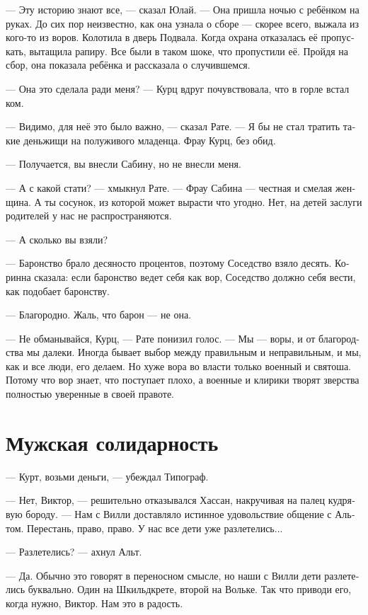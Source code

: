 \documentclass[a4paper,12pt,fleqn]{book}\usepackage{polyglossia}\setdefaultlanguage[babelshorthands=true]{russian}\setotherlanguage{english}\defaultfontfeatures{Ligatures=TeX,Mapping=tex-text}\usepackage{xcolor}\newcommand{\ml}[3]{#2}
\begin{document}
--- Эту историю знают все, --- сказал Юлай.
--- Она пришла ночью с ребёнком на руках.
До сих пор неизвестно, как она узнала о сборе --- скорее всего, выжала из кого-то из воров.
Колотила в дверь Подвала.
Когда охрана отказалась её пропускать, вытащила рапиру.
Все были в таком шоке, что пропустили её.
Пройдя на сбор, она показала ребёнка и рассказала о случившемся.

--- Она это сделала ради меня? --- Курц вдруг почувствовала, что в горле встал ком.

--- Видимо, для неё это было важно, --- сказал Рате.
--- Я бы не стал тратить такие деньжищи на полуживого младенца.
Фрау Курц, без обид.

--- Получается, вы внесли Сабину, но не внесли меня.

--- А с какой стати? --- хмыкнул Рате.
--- Фрау Сабина --- честная и смелая женщина.
А ты сосунок, из которой может вырасти что угодно.
Нет, на детей заслуги родителей у нас не распространяются.

--- А сколько вы взяли?

--- Баронство брало десяносто процентов, поэтому Соседство взяло десять.
Коринна сказала: если баронство ведет себя как вор, Соседство должно себя вести, как подобает баронству.

--- Благородно.
Жаль, что барон — не она.

--- Не обманывайся, Курц, --- Рате понизил голос.
--- Мы --- воры, и от благородства мы далеки.
Иногда бывает выбор между правильным и неправильным, и мы, как и все люди, его делаем.
Но хуже вора во власти только военный и святоша.
Потому что вор знает, что поступает плохо, а военные и клирики творят зверства полностью уверенные в своей правоте.

\section{Мужская солидарность}

--- Курт, возьми деньги, --- убеждал Типограф.

--- Нет, Виктор, --- решительно отказывался Хассан, накручивая на палец кудрявую бороду.
--- Нам с Вилли доставляло истинное удовольствие общение с Альтом.
Перестань, право, право.
У нас все дети уже разлетелись...

--- Разлетелись? --- ахнул Альт.

--- Да.
Обычно это говорят в переносном смысле, но наши с Вилли дети разлетелись буквально.
Один на Шкильдкрете, второй на Вольке.
Так что приводи его, когда нужно, Виктор.
Нам это в радость.
\end{document}
